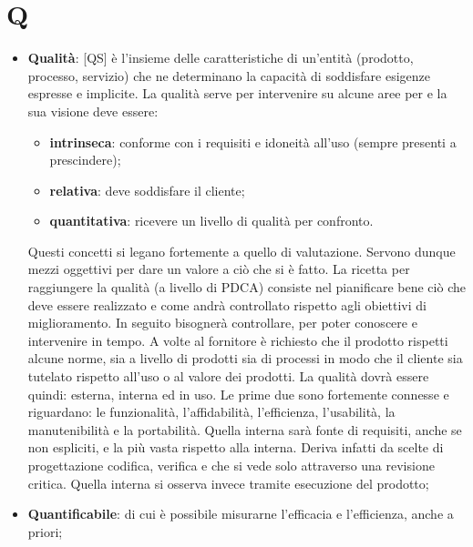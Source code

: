 %
%
%

\section{Q}

\begin{itemize}
	\item \textbf{Qualità}: [QS] è l'insieme delle caratteristiche di un'entità (prodotto, processo, servizio) che ne determinano la capacità di soddisfare esigenze espresse e implicite. La qualità serve per intervenire su alcune aree per e la sua visione deve essere:
		\begin{itemize}
			\item \textbf{intrinseca}: conforme con i requisiti e idoneità all'uso (sempre presenti a prescindere);
			\item \textbf{relativa}: deve soddisfare il cliente;
			\item \textbf{quantitativa}: ricevere un livello di qualità per confronto.
		\end{itemize}
		\noindent
		Questi concetti si legano fortemente a quello di valutazione. Servono dunque mezzi oggettivi per dare un valore a ciò che si è fatto. \newline
		La ricetta per raggiungere la qualità (a livello di PDCA) consiste nel pianificare bene ciò che deve essere realizzato e come andrà controllato rispetto agli obiettivi di miglioramento. In seguito bisognerà controllare, per poter conoscere e intervenire in tempo. \newline
		A volte al fornitore è richiesto che il prodotto rispetti alcune norme, sia a livello di prodotti sia di processi in modo che il cliente sia tutelato rispetto all'uso o al valore dei prodotti. \newline
		La qualità dovrà essere quindi: esterna, interna ed in uso. Le prime due sono fortemente connesse e riguardano: le funzionalità, l'affidabilità, l'efficienza, l'usabilità, la manutenibilità e la portabilità. Quella interna sarà fonte di requisiti, anche se non espliciti, e la più vasta rispetto alla interna. Deriva infatti da scelte di progettazione codifica, verifica e che si vede solo attraverso una revisione critica. Quella interna si osserva invece tramite esecuzione del prodotto;
	\item \textbf{Quantificabile}: di cui è possibile misurarne l'efficacia e l'efficienza, anche a priori;

\end{itemize}